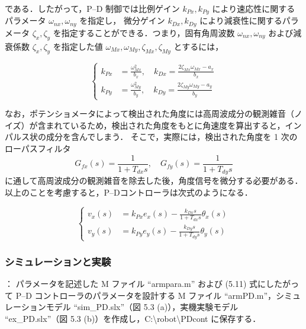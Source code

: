 である．したがって，P--D 制御では比例ゲイン $k_{Px}, k_{Py}$ により速応性に関するパラメータ $\omega_{nx}, \omega_{ny}$ を指定し，
微分ゲイン $k_{Dx}, k_{Dy}$ により減衰性に関するパラメータ $\zeta_x, \zeta_y$ を指定することができる．つまり，固有角周波数
$\omega_{nx}, \omega_{ny}$ および減衰係数 $\zeta_x, \zeta_y$ を指定した値 $\omega_{Mx}, \omega_{My}, \zeta_{Mx}, \zeta_{My}$ とするには，

\begin{equation}
\left\{
\begin{aligned}
    k_{Px} &= \frac{\omega_{Mx}^2}{b_x}, \quad
    k_{Dx} = \frac{2\zeta_{Mx} \omega_{Mx} - a_x}{b_x} \\
    k_{Py} &= \frac{\omega_{My}^2}{b_y}, \quad
    k_{Dy} = \frac{2\zeta_{My} \omega_{My} - a_y}{b_y}
\end{aligned}
\right.
\tag{5.10}
\end{equation}

なお，ポテンショメータによって検出された角度には高周波成分の観測雑音（ノイズ）が含まれているため，検出された角度をもとに角速度を算出すると，インパルス状の成分を含んでしまう．
そこで，実際には，検出された角度を 1 次のローパスフィルタ
\begin{equation}
    G_{fx}(s) = \frac{1}{1 + T_{dx}s}, \quad G_{fy}(s) = \frac{1}{1 + T_{dy}s}
\end{equation}
に通して高周波成分の観測雑音を除去した後，角度信号を微分する必要がある．以上のことを考慮すると，P--Dコントローラは次式のようになる．

\begin{equation}
\left\{
\begin{aligned}
    v_x(s) &= k_{Px} e_x(s) - \frac{k_{Dx}s}{1 + T_{dx}s} \theta_x(s) \\
    v_y(s) &= k_{Py} e_y(s) - \frac{k_{Dy}s}{1 + T_{dy}s} \theta_y(s)
\end{aligned}
\right.
\tag{5.11}
\end{equation}

\subsubsection{シミュレーションと実験}
：
パラメータを記述した M ファイル ``armpara.m'' および (5.11) 式にしたがって P--D コントローラのパラメータを設計する M ファイル ``armPD.m''，シミュレーションモデル ``sim\_PD.slx''（図 5.3 (a)），実機実験モデル ``ex\_PD.slx''（図 5.3 (b)）を作成し，C:\textbackslash robot\textbackslash PDcont に保存する．

